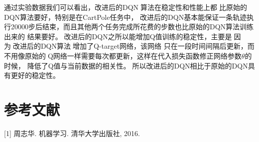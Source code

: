 \documentclass[a4paper,UTF8]{article}
\theoremstyle{definition}
\begin{document}
通过实验数据我们可以看出，改进后的DQN算法在稳定性和性能上都比原始的DQN算法要好，特别是在CartPole任务中，
改进后的DQN基本能保证一条轨迹执行20000步后结束，而且其他两个任务完成所花费的步数也比原始的DQN算法训练出来的
结果要好。改进后的DQN之所以能增加Q值训练的稳定性，主要是因为改进后的DQN算法增加了Q-target网络，该网络
只在一段时间间隔后更新，而不用像原始的Q网络一样需要每次都更新，这样在代入损失函数修正网络参数$\theta$的时候，
降低了Q值与当前数据的相关性。所以改进后的DQN相比于原始的DQN具有更好的稳定性。

\section*{参考文献}

[1] 周志华. 机器学习. 清华大学出版社, 2016.
\end{document}
